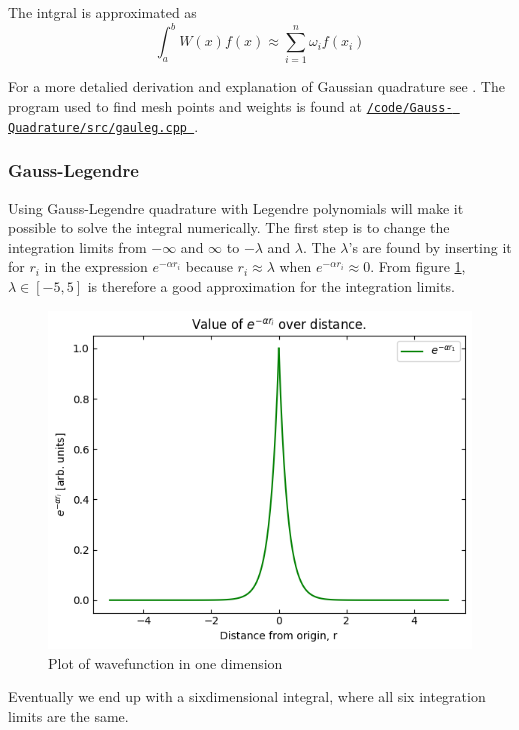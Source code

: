 \documentclass[../main.tex]{subfiles}
\begin{document}
The intgral is approximated as
\[\int_a^b W(x)f(x) \approx \sum_{i=1}^n \omega_i f(x_i) \]

For a more detalied derivation and explanation of Gaussian quadrature see \cite{MortenMC2019}. The program used to find mesh points and weights is found at \href{https://github.com/kmaasrud/Project-3/blob/master/code/Gauss-Quadrature/src/gauleg.cpp}{\texttt{/code/Gauss- Quadrature/src/gauleg.cpp
}}.

\subsubsection{Gauss-Legendre}\label{sec:GLQ}
Using Gauss-Legendre quadrature with Legendre polynomials will make it possible to solve the integral numerically. The first step is to change the integration limits from  $-\infty$ and $\infty$ to $-\lambda$ and $\lambda$. The $\lambda$'s are found by inserting it for $r_i$ in the expression $e^{-\alpha r_i}$ because $r_i \approx \lambda$ when $e^{-\alpha r_i} \approx 0$. From figure \ref{fig:plot}, $\lambda \in [-5,5]$ is therefore a good approximation for the integration limits.

\begin{figure}[!h]
  \includegraphics[width=\textwidth]{img/expfunc_plot.png}
  \caption{Plot of wavefunction in one dimension}
  \label{fig:plot}
\end{figure}
\FloatBarrier


Eventually we end up with a sixdimensional integral, where all six integration limits are the same.
\end{document}
